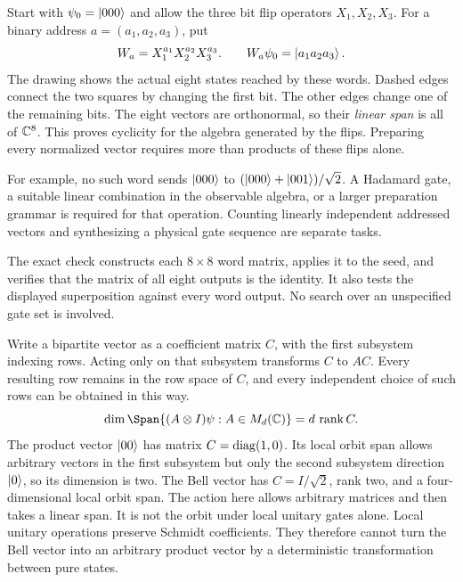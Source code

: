 Start with $\psi_0=\left|000\right\rangle$ and allow the three bit flip operators $X_1,X_2,X_3$. For a binary address $a=(a_1,a_2,a_3)$, put
\[
W_a=X_1^{a_1}X_2^{a_2}X_3^{a_3}.
\qquad W_a\psi_0=\left|a_1a_2a_3\right\rangle.
\]
The drawing shows the actual eight states reached by these words. Dashed edges connect the two squares by changing the first bit. The other edges change one of the remaining bits.
The eight vectors are orthonormal, so their \emph{linear span} is all of $\CC^8$. This proves cyclicity for the algebra generated by the flips. Preparing every normalized vector requires more than products of these flips alone.

For example, no such word sends $\left|000\right\rangle$ to $(\left|000\right\rangle+\left|001\right\rangle)/\sqrt2$. A Hadamard gate, a suitable linear combination in the observable algebra, or a larger preparation grammar is required for that operation. Counting linearly independent addressed vectors and synthesizing a physical gate sequence are separate tasks.

The exact check constructs each $8\times8$ word matrix, applies it to the seed, and verifies that the matrix of all eight outputs is the identity. It also tests the displayed superposition against every word output. No search over an unspecified gate set is involved.

Write a bipartite vector as a coefficient matrix $C$, with the first subsystem indexing rows. Acting only on that subsystem transforms $C$ to $AC$. Every resulting row remains in the row space of $C$, and every independent choice of such rows can be obtained in this way.
\[
\dim\Span\{(A\otimes I)\psi:A\in M_d(\CC)\}
=d\,\rank C.
\]
The product vector $\left|00\right\rangle$ has matrix $C=\operatorname{diag}(1,0)$. Its local orbit span allows arbitrary vectors in the first subsystem but only the second subsystem direction $\left|0\right\rangle$, so its dimension is two. The Bell vector has $C=I/\sqrt2$, rank two, and a four-dimensional local orbit span.
The action here allows arbitrary matrices and then takes a linear span. It is not the orbit under local unitary gates alone. Local unitary operations preserve Schmidt coefficients. They therefore cannot turn the Bell vector into an arbitrary product vector by a deterministic transformation between pure states.

